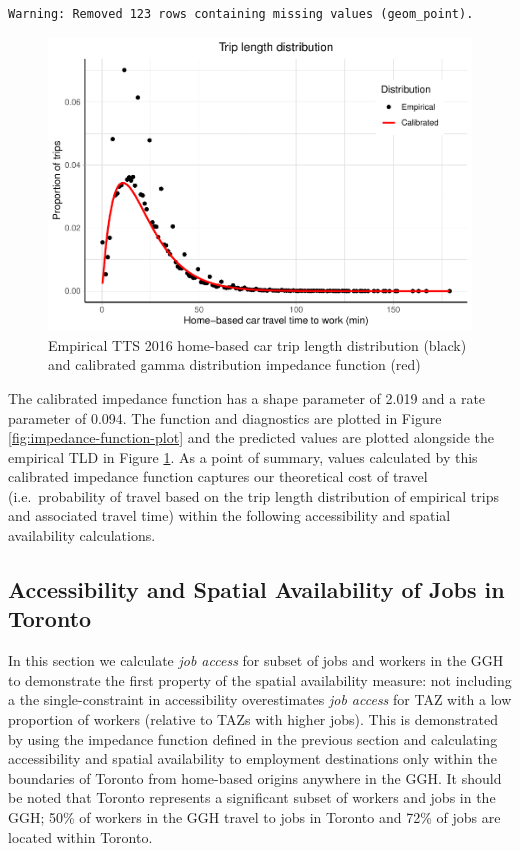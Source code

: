 \documentclass[]{elsarticle} %
\begin{document}
\begin{verbatim}
Warning: Removed 123 rows containing missing values (geom_point).
\end{verbatim}

\begin{figure}
\includegraphics[width=1\linewidth]{Spatial-Availability_files/figure-latex/TLD-Gamma-plot-1} \caption{\label{fig:TLD-Gamma-plot}Empirical TTS 2016 home-based car trip length distribution (black) and calibrated gamma distribution impedance function (red)}\label{fig:TLD-Gamma-plot}
\end{figure}

The calibrated impedance function has a shape parameter of 2.019 and a
rate parameter of 0.094. The function and diagnostics are plotted in
Figure \ref{fig:impedance-function-plot} and the predicted values are
plotted alongside the empirical TLD in Figure \ref{fig:TLD-Gamma-plot}.
As a point of summary, values calculated by this calibrated impedance
function captures our theoretical cost of travel (i.e.~probability of
travel based on the trip length distribution of empirical trips and
associated travel time) within the following accessibility and spatial
availability calculations.

\hypertarget{accessibility-and-spatial-availability-of-jobs-in-toronto}{%
\subsection{Accessibility and Spatial Availability of Jobs in
Toronto}\label{accessibility-and-spatial-availability-of-jobs-in-toronto}}

In this section we calculate \emph{job access} for subset of jobs and
workers in the GGH to demonstrate the first property of the spatial
availability measure: not including a the single-constraint in
accessibility overestimates \emph{job access} for TAZ with a low
proportion of workers (relative to TAZs with higher jobs). This is
demonstrated by using the impedance function defined in the previous
section and calculating accessibility and spatial availability to
employment destinations only within the boundaries of Toronto from
home-based origins anywhere in the GGH. It should be noted that Toronto
represents a significant subset of workers and jobs in the GGH; 50\% of
workers in the GGH travel to jobs in Toronto and 72\% of jobs are
located within Toronto.
\end{document}

